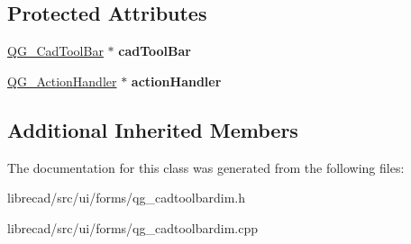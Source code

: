 \subsection*{Protected Attributes}
\begin{DoxyCompactItemize}
\item 
\hypertarget{classQG__CadToolBarDim_a5723d3b14ac0af7581af8f4d037644de}{\hyperlink{classQG__CadToolBar}{Q\-G\-\_\-\-Cad\-Tool\-Bar} $\ast$ {\bfseries cad\-Tool\-Bar}}\label{classQG__CadToolBarDim_a5723d3b14ac0af7581af8f4d037644de}

\item 
\hypertarget{classQG__CadToolBarDim_a8d1b76964ec2dfe2c06212f4441bfca3}{\hyperlink{classQG__ActionHandler}{Q\-G\-\_\-\-Action\-Handler} $\ast$ {\bfseries action\-Handler}}\label{classQG__CadToolBarDim_a8d1b76964ec2dfe2c06212f4441bfca3}

\end{DoxyCompactItemize}
\subsection*{Additional Inherited Members}


The documentation for this class was generated from the following files\-:\begin{DoxyCompactItemize}
\item 
librecad/src/ui/forms/qg\-\_\-cadtoolbardim.\-h\item 
librecad/src/ui/forms/qg\-\_\-cadtoolbardim.\-cpp\end{DoxyCompactItemize}
